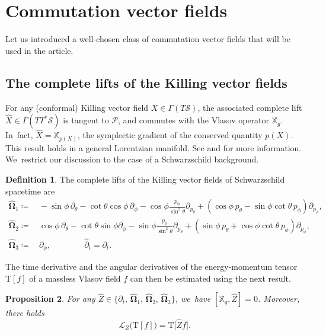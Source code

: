 \documentclass[10pt]{amsart}
\theoremstyle{plain}
\newtheorem{proposition}{Proposition}[section]
\theoremstyle{definition}
\newtheorem{definition}[proposition]{Definition}
\newcommand\T{{\mathbb{X}}}
\begin{document}
\section{Commutation vector fields}\label{Sec5}

Let us introduced a well-chosen class of commutation vector fields that will be used in the article.

\subsection{The complete lifts of the Killing vector fields}\label{Subseclift}

For any (conformal) Killing vector field $X\in \Gamma(T\mathcal{S})$, the associated complete lift $\widehat{X}\in \Gamma(TT^*\mathcal{S})$ is tangent to $\mathcal{P}$, and commutes with the Vlasov operator $\T_g$. In~fact, $\widehat{X} =\T_{p(X)}$, the symplectic gradient of the conserved quantity $p(X)$. This result holds in a general Lorentzian manifold. See \cite[App.\,F]{AGS} and \cite[App.\,C]{FJS17} for more information. We~restrict our discussion to the case of a Schwarzschild background.

\begin{definition}
The complete lifts of the Killing vector fields of Schwarzschild spacetime are
\begin{align*}
\widehat{\mathbf{\Omega}}_1 \coloneqq &\,-\sin \phi \,\partial_{\theta}-\cot \theta\cos \phi \,\partial_{\phi}-\cos\phi\frac{p_{\phi}}{\sin^2\theta}\partial_{p_{\theta}}+(\cos \phi \,p_{\theta}-\sin\phi \cot \theta \,p_{\phi})\partial_{p_{\phi}},\\
\widehat{\mathbf{\Omega}}_2 \coloneqq &\,\cos\phi \,\partial_{\theta}-\cot \theta\sin\phi\partial_{\phi}-\sin\phi \frac{p_{\phi}}{\sin^2\theta}\partial_{p_{\theta}}+(\sin\phi \,p_{\theta}+\cos\phi \cot \theta \,p_{\phi})\partial_{p_{\phi}},\\
\widehat{\mathbf{\Omega}}_3 \coloneqq &\,\partial_{\phi},\qquad\qquad \widehat{\partial}_t=\partial_t.
\end{align*}
\end{definition}

The time derivative and the angular derivatives of the energy-momentum tensor $\mathrm{T}[f]$ of a massless Vlasov field $f$ can then be estimated using the next result.

\begin{proposition}\label{ProKilling}
For any $\widehat{Z} \in \bigl\{ \partial_t,\, \widehat{\mathbf{\Omega}}_1,\, \widehat{\mathbf{\Omega}}_2,\, \widehat{\mathbf{\Omega}}_3 \bigr\}$, we~have $[\T_g,\widehat{Z} ]=0$. Moreover, there holds
\[
\mathcal{L}_Z \bigl(\mathrm{T}[f] \bigr) = \mathrm{T} \bigl[ \widehat{Z}f \bigr].
\]
\end{proposition}
\end{document}
